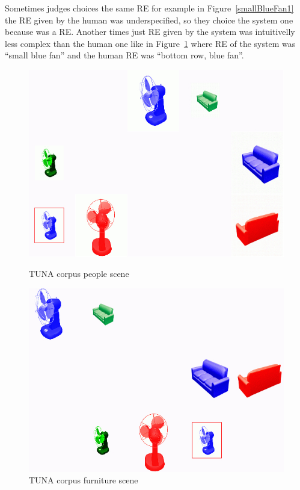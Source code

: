 Sometimes judges choices the same RE for example in Figure~\ref{smallBlueFan1} the RE given by the human was underspecified, so they choice the system one because was a RE. Another times just RE given by the system was intuitivelly less complex than the human one like in Figure~\ref{smallBlueFan} where RE of the system was ``small blue fan'' and the human RE was ``bottom row, blue fan''.
\begin{figure}[ht]
\begin{minipage}{0.50\linewidth}
\centering
\includegraphics[width=\textwidth]{images/smallBlueFan1.jpg}
\caption{TUNA corpus people scene}
\label{smallBlueFan1}
\end{minipage}
\begin{minipage}{0.50\linewidth}
\centering
\includegraphics[width=\textwidth]{images/smallBlueFan.jpg}
\caption{TUNA corpus furniture scene}
\label{smallBlueFan}
\end{minipage}
\end{figure}

